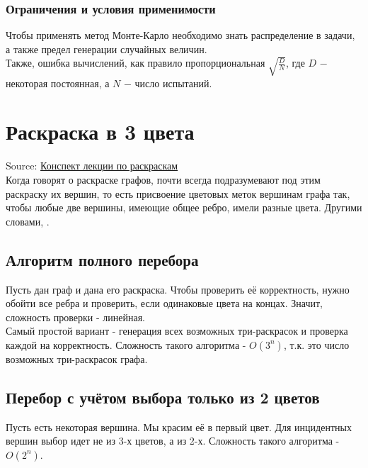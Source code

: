         \subsubsection{Ограничения и условия применимости}

            Чтобы применять метод Монте-Карло необходимо знать распределение в задачи, а также предел генерации случайных величин.\\

            Также, ошибка вычислений, как правило пропорциональная $\sqrt{\frac{D}{N}}$, где $D$ $-$ некоторая постоянная, а $N$ $-$ число испытаний.
        
\newpage
\section{Раскраска в 3 цвета}
    Source: \href{https://se.moevm.info/doku.php/courses:algorithms_building_and_analysis:materials:graph_coloring_notes#алгоритм_полного_перебора_совсем_наивный_перебор}{Конспект лекции по раскраскам}\\

    Когда говорят о раскраске графов, почти всегда подразумевают под этим раскраску их вершин, то есть присвоение цветовых меток вершинам графа так, чтобы любые две вершины, имеющие общее ребро, имели разные цвета. Другими словами, .
    
    \subsection{Алгоритм полного перебора}

        Пусть дан граф и дана его раскраска. Чтобы проверить её корректность, нужно обойти все ребра и проверить, если одинаковые цвета на концах. Значит, сложность проверки - линейная.\\
    
        Самый простой вариант - генерация всех возможных три-раскрасок и проверка каждой на корректность. Сложность такого алгоритма - $O(3^n)$, т.к. это число возможных три-раскрасок графа.
    
    \subsection{Перебор с учётом выбора только из 2 цветов}
        Пусть есть некоторая вершина. Мы красим её в первый цвет. Для инцидентных вершин выбор идет не из 3-х цветов, а из 2-х. Сложность такого алгоритма - $O(2^n)$.\\

